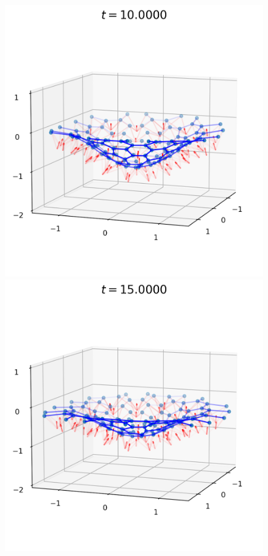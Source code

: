 \begin{landscape}
\begin{figure}[p]
	\includegraphics[width=0.4\textheight]{dynamics/04000.png}
	\includegraphics[width=0.4\textheight]{dynamics/06000.png}

\end{figure}
\end{landscape}
